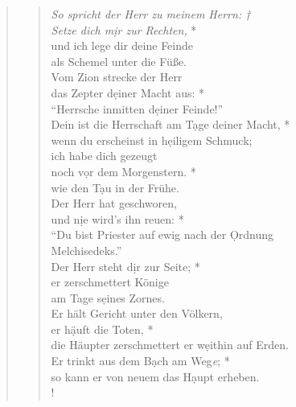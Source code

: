 \begin{quote}
\begin{verse}

\textit{So spricht der Herr zu meinem Herrn: †\\
Setze dich m\d ir zur Rechten,} *\\
und ich lege dir deine Feinde\\
als Schemel unter die Füße.\\
\vin Vom Zion strecke der Herr \\
\vin das Zepter d\d einer Macht aus: *\\
\vin ``Herrsche inmitten d\d einer Feinde!''\\
Dein ist die Herrschaft am T\d age deiner Macht, *\\
wenn du erscheinst in h\d eiligem Schmuck;\\
\vin ich habe dich gezeugt\\ 
\vin noch v\d or dem Morgenstern. *\\
\vin wie den T\d au in der Frühe.\\
Der Herr hat geschworen,\\
und n\d ie wird’s ihn reuen: *\\
``Du bist Priester auf ewig nach der \d Ordnung \\
Melchisedeks.''\\
\vin Der Herr steht d\d ir zur Seite; *\\
\vin er zerschmettert Könige\\
\vin am Tage s\d eines Zornes.\\
Er hält Gericht unter den Völkern,\\
er h\d äuft die Toten, *\\
die Häupter zerschmettert er w\d eithin auf Erden.\\
Er trinkt aus dem B\d ach am Weg\textit{e}; *\\
so kann er von neuem das H\d aupt erheben.\\!
\end{verse}
\end{quote}

\vspace{1cm}


\def\greinitialformat#1{{\fontsize{40}{40}\selectfont #1}}
\gresetfirstlineaboveinitial{\small \textcolor{red}{Ps 111}}{}
\setaboveinitialseparation{0.72mm}


